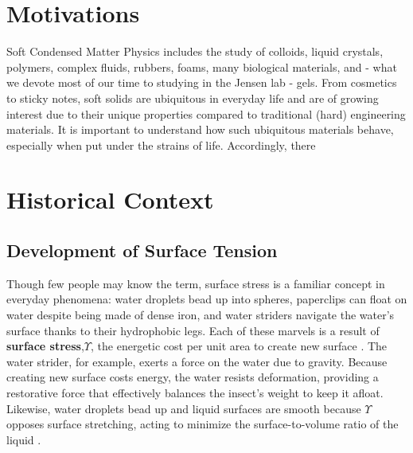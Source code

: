 

\section{Motivations}
Soft Condensed Matter Physics includes the study of colloids, liquid crystals, polymers, complex fluids, rubbers, foams, many biological materials, and - what we devote most of our time to studying in the Jensen lab - gels. From cosmetics to sticky notes, soft solids are ubiquitous in everyday life and are of growing interest due to their unique properties compared to traditional (hard) engineering materials. It is important to understand how such ubiquitous materials behave, especially when put under the strains of life. Accordingly, there 
 

 
\section{Historical Context}
\subsection{Development of Surface Tension}
Though few people may know the term, surface stress is a familiar concept in everyday phenomena: water droplets bead up into spheres, paperclips can float on water despite being made of dense iron, and water striders navigate the water's surface thanks to their hydrophobic legs. Each of these marvels is a result of \textbf{surface stress},$\Upsilon$, the  energetic cost per unit area to create new surface \cite{cammarata1994surface}. The water strider, for example, exerts a force on the water due to gravity. Because creating new surface costs energy, the water resists deformation, providing a restorative force that effectively balances the insect’s weight to keep it afloat. Likewise, water droplets bead up and liquid surfaces are smooth because $\Upsilon$ opposes surface stretching, acting to minimize the surface-to-volume ratio of the liquid \cite{gibbs1906scientific,GennesPierre-Gillesde2003Cawp} .

